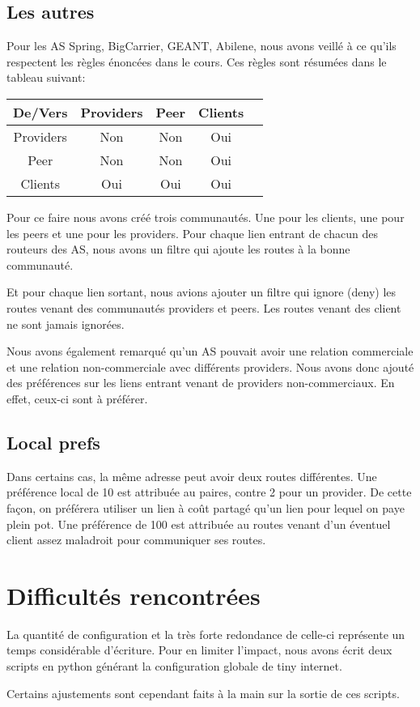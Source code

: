 \documentclass{article}
\begin{document}
\subsection{Les autres}
Pour les AS Spring, BigCarrier, GEANT, Abilene, nous avons veillé à ce qu'ils respectent les règles énoncées dans le cours. Ces règles sont résumées dans le tableau suivant:


\begin{center}
\begin{tabular}{|c|c|c|c|c|}
\hline
De/Vers & Providers & Peer & Clients \\
\hline
 Providers & Non & Non & Oui \\
\hline
 Peer & Non & Non & Oui \\
\hline
  Clients & Oui & Oui & Oui \\
\hline

\end{tabular}
\end{center}
Pour ce faire nous avons créé trois communautés. Une pour les clients, une pour les peers et une pour les providers. Pour chaque lien entrant de chacun des routeurs des AS, nous avons un filtre qui ajoute les routes à la bonne communauté.

Et pour chaque lien sortant, nous avions ajouter un filtre qui ignore (deny) les routes venant des communautés providers et peers.
Les routes venant des client ne sont jamais ignorées.

Nous avons également remarqué qu'un AS pouvait avoir une relation commerciale et une relation non-commerciale avec différents providers. Nous avons donc ajouté des préférences sur les liens entrant venant de providers non-commerciaux. En effet, ceux-ci sont à préférer.

\subsection{Local prefs}

Dans certains cas, la même adresse peut avoir deux routes différentes. Une préférence local de 10 est attribuée au paires, contre 2 pour un provider. De cette façon, on préférera utiliser un lien à coût partagé qu'un lien pour lequel on paye plein pot.
Une préférence de 100 est attribuée au routes venant d'un éventuel client assez maladroit pour communiquer ses routes.


\section*{Difficultés rencontrées}
La quantité de configuration et la très forte redondance de celle-ci représente un temps considérable d'écriture. Pour en limiter l'impact, nous avons écrit deux scripts en python générant la configuration globale de tiny internet.

Certains ajustements sont cependant faits à la main sur la sortie de ces scripts.
\end{document}
